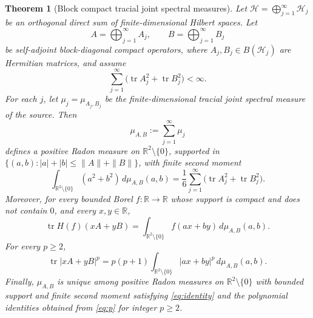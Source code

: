 \documentclass[11pt]{article}
\newtheorem{theorem}{Theorem}
\newcommand{\R}{\mathbb R}
\newcommand{\tr}{\operatorname{tr}}
\begin{document}
\begin{theorem}[Block compact tracial joint spectral measures]\label{thm:block}
Let $\mathcal H=\bigoplus_{j=1}^\infty \mathcal H_j$ be an orthogonal direct
sum of finite-dimensional Hilbert spaces.  Let
\[
  A=\bigoplus_{j=1}^\infty A_j,\qquad B=\bigoplus_{j=1}^\infty B_j
\]
be self-adjoint block-diagonal compact operators, where
$A_j,B_j\in B(\mathcal H_j)$ are Hermitian matrices, and assume
\begin{equation}\label{eq:hs}
  \sum_{j=1}^\infty \bigl(\tr A_j^2+\tr B_j^2\bigr)<\infty .
\end{equation}
For each $j$, let $\mu_j=\mu_{A_j,B_j}$ be the finite-dimensional tracial
joint spectral measure of the source.  Then
\[
  \mu_{A,B}:=\sum_{j=1}^\infty \mu_j
\]
defines a positive Radon measure on $\R^2\setminus\{0\}$, supported in
$\{(a,b): |a|+|b|\le \|A\|+\|B\|\}$, with finite second moment
\begin{equation}\label{eq:second}
  \int_{\R^2\setminus\{0\}} (a^2+b^2)\,d\mu_{A,B}(a,b)
  =\frac{1}{6}\sum_{j=1}^\infty \bigl(\tr A_j^2+\tr B_j^2\bigr).
\end{equation}
Moreover, for every bounded Borel $f:\R\to\R$ whose support is compact and
does not contain $0$, and every $x,y\in\R$,
\begin{equation}\label{eq:identity}
  \tr H(f)(xA+yB)=
  \int_{\R^2\setminus\{0\}} f(ax+by)\,d\mu_{A,B}(a,b).
\end{equation}
For every $p\ge 2$,
\begin{equation}\label{eq:p}
  \tr |xA+yB|^p
  =p(p+1)\int_{\R^2\setminus\{0\}} |ax+by|^p\,d\mu_{A,B}(a,b).
\end{equation}
Finally, $\mu_{A,B}$ is unique among positive Radon measures on
$\R^2\setminus\{0\}$ with bounded support and finite second moment satisfying
\eqref{eq:identity} and the polynomial identities obtained from
\eqref{eq:p} for integer $p\ge 2$.
\end{theorem}
\end{document}

